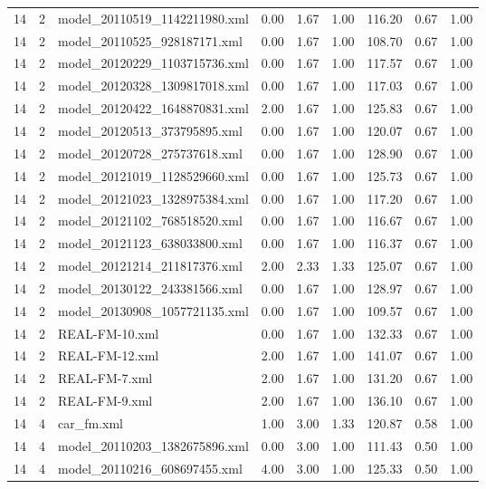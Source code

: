 \begin{table}[ht]
\begin{tabular}{rrlrrrrrr}
   14 &   2 & model\_20110519\_1142211980.xml & 0.00 & 1.67 & 1.00 & 116.20 & 0.67 & 1.00 \\ 
   14 &   2 & model\_20110525\_928187171.xml & 0.00 & 1.67 & 1.00 & 108.70 & 0.67 & 1.00 \\ 
   14 &   2 & model\_20120229\_1103715736.xml & 0.00 & 1.67 & 1.00 & 117.57 & 0.67 & 1.00 \\ 
   14 &   2 & model\_20120328\_1309817018.xml & 0.00 & 1.67 & 1.00 & 117.03 & 0.67 & 1.00 \\ 
   14 &   2 & model\_20120422\_1648870831.xml & 2.00 & 1.67 & 1.00 & 125.83 & 0.67 & 1.00 \\ 
   14 &   2 & model\_20120513\_373795895.xml & 0.00 & 1.67 & 1.00 & 120.07 & 0.67 & 1.00 \\ 
   14 &   2 & model\_20120728\_275737618.xml & 0.00 & 1.67 & 1.00 & 128.90 & 0.67 & 1.00 \\ 
   14 &   2 & model\_20121019\_1128529660.xml & 0.00 & 1.67 & 1.00 & 125.73 & 0.67 & 1.00 \\ 
   14 &   2 & model\_20121023\_1328975384.xml & 0.00 & 1.67 & 1.00 & 117.20 & 0.67 & 1.00 \\ 
   14 &   2 & model\_20121102\_768518520.xml & 0.00 & 1.67 & 1.00 & 116.67 & 0.67 & 1.00 \\ 
   14 &   2 & model\_20121123\_638033800.xml & 0.00 & 1.67 & 1.00 & 116.37 & 0.67 & 1.00 \\ 
   14 &   2 & model\_20121214\_211817376.xml & 2.00 & 2.33 & 1.33 & 125.07 & 0.67 & 1.00 \\ 
   14 &   2 & model\_20130122\_243381566.xml & 0.00 & 1.67 & 1.00 & 128.97 & 0.67 & 1.00 \\ 
   14 &   2 & model\_20130908\_1057721135.xml & 0.00 & 1.67 & 1.00 & 109.57 & 0.67 & 1.00 \\ 
   14 &   2 & REAL-FM-10.xml & 0.00 & 1.67 & 1.00 & 132.33 & 0.67 & 1.00 \\ 
   14 &   2 & REAL-FM-12.xml & 2.00 & 1.67 & 1.00 & 141.07 & 0.67 & 1.00 \\ 
   14 &   2 & REAL-FM-7.xml & 2.00 & 1.67 & 1.00 & 131.20 & 0.67 & 1.00 \\ 
   14 &   2 & REAL-FM-9.xml & 2.00 & 1.67 & 1.00 & 136.10 & 0.67 & 1.00 \\ 
   14 &   4 & car\_fm.xml & 1.00 & 3.00 & 1.33 & 120.87 & 0.58 & 1.00 \\ 
   14 &   4 & model\_20110203\_1382675896.xml & 0.00 & 3.00 & 1.00 & 111.43 & 0.50 & 1.00 \\ 
   14 &   4 & model\_20110216\_608697455.xml & 4.00 & 3.00 & 1.00 & 125.33 & 0.50 & 1.00 \\ 

\end{tabular}
\end{table}
